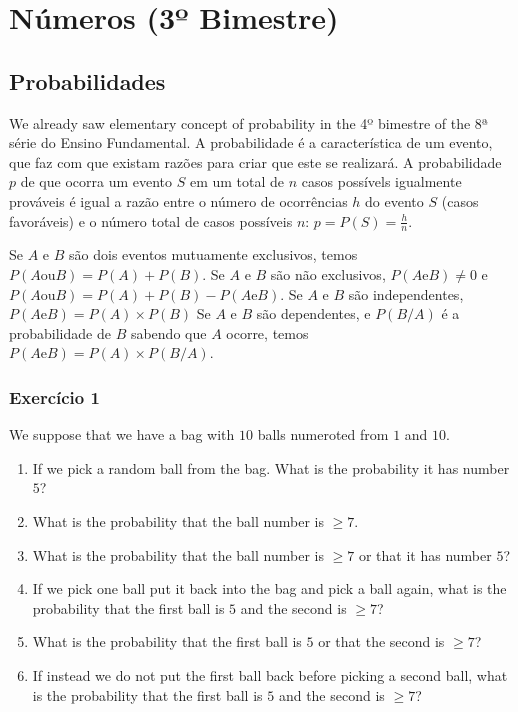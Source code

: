 \chapter{Números (3º Bimestre)}

\section{Probabilidades}

We already saw elementary concept of probability in the 4º bimestre of the
8ª série do Ensino Fundamental. A probabilidade é a
característica de um evento, que faz com que existam razões para criar que este
se realizará. A probabilidade $p$ de que ocorra um evento $S$ em um total de
$n$ casos possívels igualmente prováveis é igual a razão entre o número de
ocorrências $h$ do evento $S$ (casos favoráveis) e o número total de casos
possíveis $n$: $p=P\left(S\right)=\frac {h}{n}$.

Se $A$ e $B$ são dois eventos mutuamente exclusivos, temos
$P(A \text{ou} B) = P(A) + P(B)$. Se $A$ e $B$ são não exclusivos,
$P(A \text{e} B) \neq 0$ e
$P(A \text{ou} B) = P(A) + P(B) - P(A \text{e} B)$.
Se $A$ e $B$ são independentes,
${P(A \text{e} B)} = {P(A)} \times {P(B)}$
Se $A$ e $B$ são dependentes, e $P\left(B/A\right)$ é a probabilidade
de $B$ sabendo que $A$ ocorre, temos
${P(A \text{e} B)} = {P(A)} \times {P\left(B/A\right)}$.

\subsection*{Exercício 1}

We suppose that we have a bag with $10$ balls numeroted from $1$ and $10$.

\begin{enumerate}
\item If we pick a random ball from the bag. What is the probability it has
  number $5$?
\item What is the probability that the ball number is $\geq 7$.
\item What is the probability that the ball number is $\geq 7$ or
  that it has number $5$?
\item If we pick one ball put it back into the bag and pick a ball again,
  what is the probability that the first ball is $5$ and the second is $\geq 7$?
\item What is the probability that the first ball is $5$ or that the second
  is $\geq 7$?
\item
  If instead we do not put the first ball back before picking a second ball,
  what is the probability that the first ball is $5$ and the second is
  $\geq 7$?
\end{enumerate}

